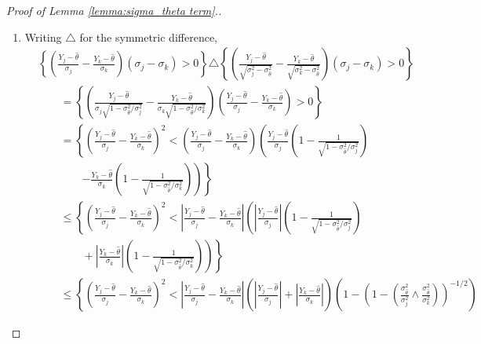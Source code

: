 \documentclass[12pt]{article}
\newcommand{\y}{Y}
\begin{document}
\begin{proof}[Proof of Lemma \ref{lemma:sigma_theta term}.]
\begin{enumerate}[wide, labelwidth=!, labelindent=0pt]
      \item\label{lemma:1:step:1} Writing $\triangle$ for the symmetric difference,
        \begin{align}
        &\left\{\left(\frac{\y_j-\hat\theta}{\sigma_j}-\frac{\y_k-\hat\theta}{\sigma_k}\right)(\sigma_j-\sigma_k)>0\right\} \triangle
          \left\{\left(\frac{\y_j-\hat\theta}{\sqrt{\sigma_j^2-\sigma_{\hat\theta}^2}} - \frac{\y_k-\hat\theta}{\sqrt{\sigma_k^2-\sigma_{\hat\theta}^2}}\right)(\sigma_j-\sigma_k)>0\right\}\\
        &\qquad=\left\{\left(\frac{\y_j-\hat\theta}{\sigma_j\sqrt{1-\sigma^2_{\hat\theta}/\sigma_j^2}}-\frac{\y_k-\hat\theta}{\sigma_k\sqrt{1-\sigma^2_{\hat\theta}/\sigma_k^2}}\right)\left(\frac{\y_j-\hat\theta}{\sigma_j} - \frac{\y_k-\hat\theta}{\sigma_k}\right)>0\right\}     \\
          &\qquad= \left\{\left(\frac{\y_j-\hat\theta}{\sigma_j} - \frac{\y_k-\hat\theta}{\sigma_k} \right)^2 <
          \left(\frac{\y_j-\hat\theta}{\sigma_j} - \frac{\y_k-\hat\theta}{\sigma_k} \right)
          \left(
          \frac{\y_j-\hat\theta}{\sigma_j}\left(1-\frac{1}{\sqrt{1-\sigma^2_{\hat\theta}/\sigma_j^2}}\right)  
          \right.\right.\\ &\qquad\qquad\left.\left.
          - \frac{\y_k-\hat\theta}{\sigma_k}\left(1-\frac{1}{\sqrt{1-\sigma^2_{\hat\theta}/\sigma_k^2}}\right)
                      \right)\right\}\\
        &\qquad\le \left\{\left(\frac{\y_j-\hat\theta}{\sigma_j} - \frac{\y_k-\hat\theta}{\sigma_k} \right)^2 <
          \left|\frac{\y_j-\hat\theta}{\sigma_j} - \frac{\y_k-\hat\theta}{\sigma_k} \right|
          \left(
          \left|\frac{\y_j-\hat\theta}{\sigma_j}\right|\left(1-\frac{1}{\sqrt{1-\sigma^2_{\hat\theta}/\sigma_j^2}}\right)  
          \right.\right.\\ &\qquad\qquad+\left.\left.
          \left|\frac{\y_k-\hat\theta}{\sigma_k}\right|\left(1-\frac{1}{\sqrt{1-\sigma^2_{\hat\theta}/\sigma_k^2}}\right)
                      \right)\right\}\\
        &\qquad\le \left\{\left(\frac{\y_j-\hat\theta}{\sigma_j} - \frac{\y_k-\hat\theta}{\sigma_k} \right)^2 <
          \left|\frac{\y_j-\hat\theta}{\sigma_j} - \frac{\y_k-\hat\theta}{\sigma_k} \right|
          \left(
          \left|\frac{\y_j-\hat\theta}{\sigma_j}\right| +\left|\frac{\y_k-\hat\theta}{\sigma_k}\right|\right)
          \left(1-\left(1-\left(\frac{\sigma_{\hat\theta}^2}{\sigma_j^2} \wedge \frac{\sigma_{\hat\theta}^2}{\sigma_k^2}\right)\right)^{-1/2}\right)

\end{align}
\end{enumerate}
\end{proof}
\end{document}
